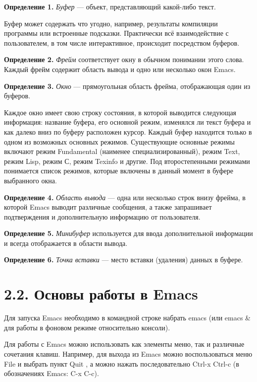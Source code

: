 \documentclass[
  english,
  russian,
  12pt,
  a4paper,
]{scrreprt}
\begin{document}
\textbf{Определение 1.} \emph{Буфер} --- объект, представляющий
какой-либо текст.

Буфер может содержать что угодно, например, результаты компиляции
программы или встроенные подсказки. Практически всё взаимодействие с
пользователем, в том числе интерактивное, происходит посредством
буферов.

\textbf{Определение 2.} \emph{Фрейм} соответствует окну в обычном
понимании этого слова. Каждый фрейм содержит область вывода и одно или
несколько окон Emacs.

\textbf{Определение 3.} \emph{Окно} --- прямоугольная область фрейма,
отображающая один из буферов.

Каждое окно имеет свою строку состояния, в которой выводится следующая
информация: название буфера, его основной режим, изменялся ли текст
буфера и как далеко вниз по буферу расположен курсор. Каждый буфер
находится только в одном из возможных основных режимов. Существующие
основные режимы включают режим Fundamental (наименее
специализированный), режим Text, режим Lisp, режим С, режим Texinfo и
другие. Под второстепенными режимами понимается список режимов, которые
включены в данный момент в буфере выбранного окна.

\textbf{Определение 4.} \emph{Область вывода} --- одна или несколько
строк внизу фрейма, в которой Emacs выводит различные сообщения, а также
запрашивает подтверждения и дополнительную информацию от пользователя.

\textbf{Определение 5.} \emph{Минибуфер} используется для ввода
дополнительной информации и всегда отображается в области вывода.

\textbf{Определение 6.} \emph{Точка вставки} --- место вставки
(удаления) данных в буфере.

\section{2.2. Основы работы в
Emacs}\label{ux43eux441ux43dux43eux432ux44b-ux440ux430ux431ux43eux442ux44b-ux432-emacs}

Для запуска Emacs необходимо в командной строке набрать emacs (или emacs
\& для работы в фоновом режиме относительно консоли).

Для работы с Emacs можно использовать как элементы меню, так и различные
сочетания клавиш. Например, для выхода из Emacs можно воспользоваться
меню File и выбрать пункт Quit , а можно нажать последовательно Ctrl-x
Ctrl-c (в обозначениях Emacs: C-x C-c).
\end{document}
